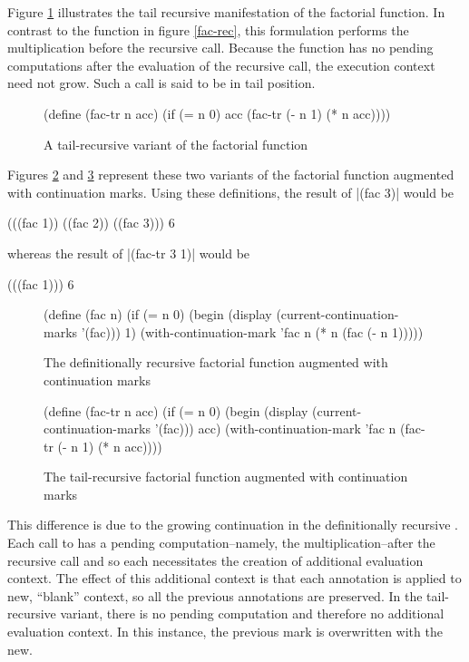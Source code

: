 Figure \ref{fac-tail-rec} illustrates the tail recursive manifestation of the factorial
function. In contrast to the function in figure \ref{fac-rec}, this formulation performs
the multiplication before the recursive call. Because the function has no pending
computations after the evaluation of the recursive call, the execution context need not
grow. Such a call is said to be in tail position.

\begin{figure}
\begin{schemeblock}
(define (fac-tr n acc)
  (if (= n 0)
      acc
      (fac-tr (- n 1) (* n acc))))
\end{schemeblock}
\caption{A tail-recursive variant of the factorial function}
\label{fac-tail-rec}
\end{figure}

Figures \ref{fac-rec-cm} and \ref{fac-tail-rec-cm} represent these two variants of the
factorial function augmented with continuation marks. Using these definitions, the 
result of \scheme|(fac 3)| would be

\begin{schemeblock}
(((fac 1)) ((fac 2)) ((fac 3)))
6
\end{schemeblock}

whereas the result of \scheme|(fac-tr 3 1)| would be

\begin{schemeblock}
(((fac 1)))
6
\end{schemeblock}

\begin{figure}
\begin{schemeblock}
(define (fac n)
  (if (= n 0)
      (begin
        (display (current-continuation-marks '(fac)))
        1)
      (with-continuation-mark 'fac n (* n (fac (- n 1)))))
\end{schemeblock}
\caption{The definitionally recursive factorial function augmented with continuation marks}
\label{fac-rec-cm}
\end{figure}

\begin{figure}
\begin{schemeblock}
(define (fac-tr n acc)
  (if (= n 0)
      (begin
        (display (current-continuation-marks '(fac)))
        acc)
      (with-continuation-mark 'fac n (fac-tr (- n 1) (* n acc))))
\end{schemeblock}
\caption{The tail-recursive factorial function augmented with continuation marks}
\label{fac-tail-rec-cm}
\end{figure}

This difference is due to the growing continuation in the definitionally recursive
. Each call to  has a pending computation--namely, the
multiplication--after the recursive call and so each necessitates the creation of
additional evaluation context. The effect of this additional context is that each
annotation is applied to new, ``blank'' context, so all the previous annotations are
preserved. In the tail-recursive variant, there is no pending computation and therefore no
additional evaluation context. In this instance, the previous mark is overwritten with the
new.

